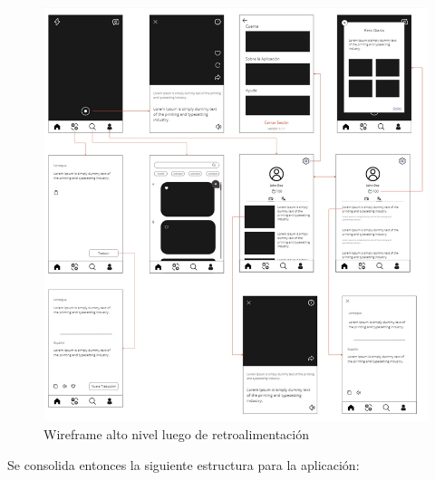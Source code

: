 \begin{figure} [H]
    \centering
    \includegraphics[width=1\linewidth]{figuras/wireframe_alto2.png}
    \caption{Wireframe alto nivel luego de retroalimentación}
    \label{fig:enter-label}
\end{figure}

Se consolida entonces la siguiente estructura para la aplicación:

